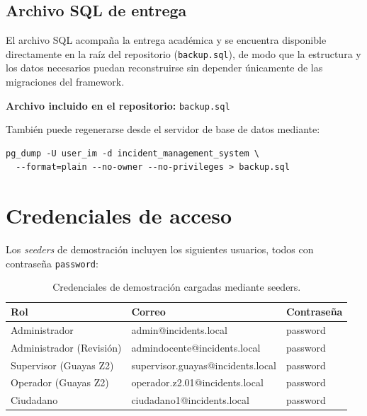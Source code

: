 \documentclass[12pt,a4paper]{article}
\begin{document}
\subsection{Archivo SQL de entrega}

El archivo SQL acompaña la entrega académica y se encuentra disponible directamente en la raíz del repositorio (\texttt{backup.sql}), de modo que la estructura y los datos necesarios puedan reconstruirse sin depender únicamente de las migraciones del framework.

\begin{center}
\textbf{Archivo incluido en el repositorio:} \texttt{backup.sql}
\end{center}

También puede regenerarse desde el servidor de base de datos mediante:

\begin{verbatim}
pg_dump -U user_im -d incident_management_system \
  --format=plain --no-owner --no-privileges > backup.sql
\end{verbatim}

\section{Credenciales de acceso}

Los \textit{seeders} de demostración incluyen los siguientes usuarios, todos con contraseña \texttt{password}:

\begin{table}[H]
\centering
\small
{}
\begin{tabularx}{\textwidth}{@{}l X l@{}}
\toprule
\textbf{Rol} & \textbf{Correo} & \textbf{Contraseña} \\
\midrule
Administrador & admin@incidents.local & password \\
Administrador (Revisión) & admindocente@incidents.local & password \\
Supervisor (Guayas Z2) & supervisor.guayas@incidents.local & password \\
Operador (Guayas Z2) & operador.z2.01@incidents.local & password \\
Ciudadano & ciudadano1@incidents.local & password \\
\bottomrule
\end{tabularx}
\caption{Credenciales de demostración cargadas mediante seeders.}
\end{table}
\end{document}
